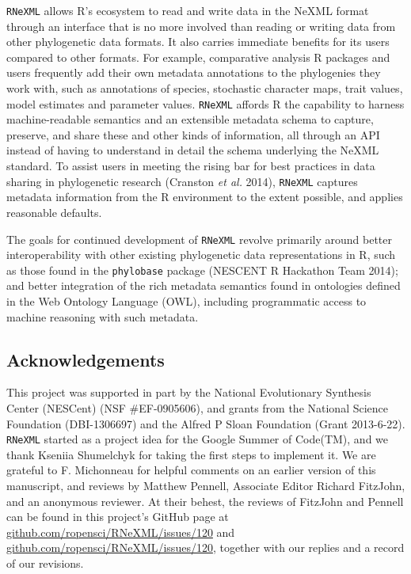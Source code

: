 \documentclass[author-year, review, 11pt]{components/elsarticle} %
\begin{document}
\texttt{RNeXML} allows R's ecosystem to read and write data in the NeXML
format through an interface that is no more involved than reading or
writing data from other phylogenetic data formats. It also carries
immediate benefits for its users compared to other formats. For example,
comparative analysis R packages and users frequently add their own
metadata annotations to the phylogenies they work with, such as
annotations of species, stochastic character maps, trait values, model
estimates and parameter values. \texttt{RNeXML} affords R the capability
to harness machine-readable semantics and an extensible metadata schema
to capture, preserve, and share these and other kinds of information,
all through an API instead of having to understand in detail the schema
underlying the NeXML standard. To assist users in meeting the rising bar
for best practices in data sharing in phylogenetic research (Cranston
\emph{et al.} 2014), \texttt{RNeXML} captures metadata information from
the R environment to the extent possible, and applies reasonable
defaults.

The goals for continued development of \texttt{RNeXML} revolve primarily
around better interoperability with other existing phylogenetic data
representations in R, such as those found in the \texttt{phylobase}
package (NESCENT R Hackathon Team 2014); and better integration of the
rich metadata semantics found in ontologies defined in the Web Ontology
Language (OWL), including programmatic access to machine reasoning with
such metadata.

\subsection{Acknowledgements}\label{acknowledgements}

This project was supported in part by the National Evolutionary
Synthesis Center (NESCent) (NSF \#EF-0905606), and grants from the
National Science Foundation (DBI-1306697) and the Alfred P Sloan
Foundation (Grant 2013-6-22). \texttt{RNeXML} started as a project idea
for the Google Summer of Code(TM), and we thank Kseniia Shumelchyk for
taking the first steps to implement it. We are grateful to F. Michonneau
for helpful comments on an earlier version of this manuscript, and
reviews by Matthew Pennell, Associate Editor Richard FitzJohn, and an
anonymous reviewer. At their behest, the reviews of FitzJohn and Pennell
can be found in this project's GitHub page at
\href{https://github.com/ropensci/RNeXML/issues/121}{github.com/ropensci/RNeXML/issues/120}
and
\href{https://github.com/ropensci/RNeXML/issues/120}{github.com/ropensci/RNeXML/issues/120},
together with our replies and a record of our revisions.
\end{document}
